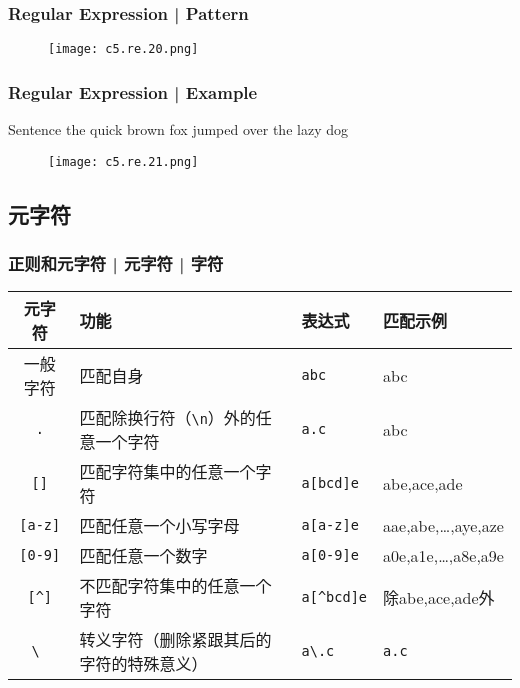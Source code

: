 \begin{frame}
  \frametitle{Regular Expression | Pattern}
  \begin{figure}
    \centering
    \texttt{[image: c5.re.20.png]}
  \end{figure}
\end{frame}

\begin{frame}
  \frametitle{Regular Expression | Example}
  \begin{block}{Sentence}
    the quick brown fox jumped over the lazy dog
  \end{block}
  \begin{figure}
    \centering
    \texttt{[image: c5.re.21.png]}
  \end{figure}
\end{frame}

\subsection{元字符}

\begin{frame}[fragile]
  \frametitle{正则和元字符 | 元字符 | \alert{字符}}
  \begin{table}
    \centering
    \begin{tabularx}{\textwidth}{cXll}
      \hline
      \rowcolor{blue!50}元字符 & 功能 & 表达式 & 匹配示例\\
      \hline
      一般字符 & 匹配自身 & \verb|abc| & abc\\
      \verb|.| & 匹配除换行符（\verb|\n|）外的任意一个字符 & \verb|a.c| & abc\\
      \verb|[]| & 匹配字符集中的任意一个字符 & \verb|a[bcd]e| & abe,ace,ade\\
      \verb|[a-z]| & 匹配任意一个小写字母 & \verb|a[a-z]e| & aae,abe,\ldots,aye,aze\\
      \verb|[0-9]| & 匹配任意一个数字 & \verb|a[0-9]e| & a0e,a1e,\ldots,a8e,a9e\\
      \verb|[^]| & 不匹配字符集中的任意一个字符 & \verb|a[^bcd]e| & 除abe,ace,ade外\\
      \verb|\ | & 转义字符（删除紧跟其后的字符的特殊意义） & \verb|a\.c| & \verb|a.c|\\
      \hline
    \end{tabularx}
  \end{table}
\end{frame}

